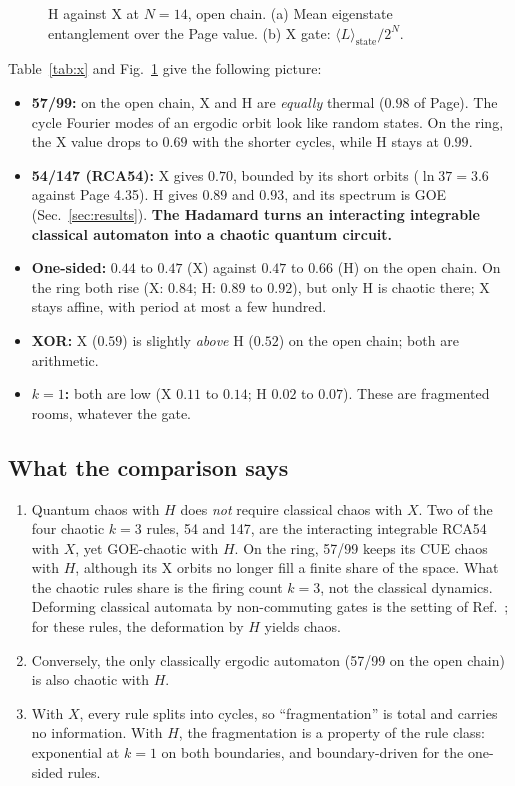 \begin{figure}[h]
\centering
{}
\caption{H against X at $N=14$, open chain. (a) Mean eigenstate entanglement over the Page value. (b) X gate:
$\langle L\rangle_\mathrm{state}/2^N$.}
\label{fig:hx}
\end{figure}

Table~\ref{tab:x} and Fig.~\ref{fig:hx} give the following picture:
\begin{itemize}
\item \textbf{57/99:} on the open chain, X and H are \emph{equally} thermal ($0.98$ of Page). The cycle Fourier modes of an
  ergodic orbit look like random states. On the ring, the X value drops to $0.69$ with the shorter cycles, while H stays
  at $0.99$.
\item \textbf{54/147 (RCA54):} X gives $0.70$, bounded by its short orbits ($\ln 37=3.6$ against Page 4.35). H gives
  $0.89$ and $0.93$, and its spectrum is GOE (Sec.~\ref{sec:results}). \textbf{The Hadamard turns an interacting integrable
  classical automaton into a chaotic quantum circuit.}
\item \textbf{One-sided:} $0.44$ to $0.47$ (X) against $0.47$ to $0.66$ (H) on the open chain. On the ring both rise
  (X: $0.84$; H: $0.89$ to $0.92$), but only H is chaotic there; X stays affine, with period at most a few hundred.
\item \textbf{XOR:} X ($0.59$) is slightly \emph{above} H ($0.52$) on the open chain; both are arithmetic.
\item \textbf{$k=1$:} both are low (X $0.11$ to $0.14$; H $0.02$ to $0.07$). These are fragmented rooms, whatever the gate.
\end{itemize}

\subsection{What the comparison says}
\begin{enumerate}
\item Quantum chaos with $H$ does \emph{not} require classical chaos with $X$. Two of the four chaotic $k=3$ rules, 54 and
  147, are the interacting integrable RCA54 with $X$, yet GOE-chaotic with $H$. On the ring, 57/99 keeps its CUE chaos
  with $H$, although its X orbits no longer fill a finite share of the space. What the chaotic rules share is the firing
  count $k=3$, not the classical dynamics. Deforming classical automata by non-commuting gates is the setting of
  Ref.~\cite{iadecola2020}; for these rules, the deformation by $H$ yields chaos.
\item Conversely, the only classically ergodic automaton (57/99 on the open chain) is also chaotic with $H$.
\item With $X$, every rule splits into cycles, so ``fragmentation'' is total and carries no information. With $H$, the
  fragmentation is a property of the rule class: exponential at $k=1$ on both boundaries, and boundary-driven for the
  one-sided rules.
\end{enumerate}
